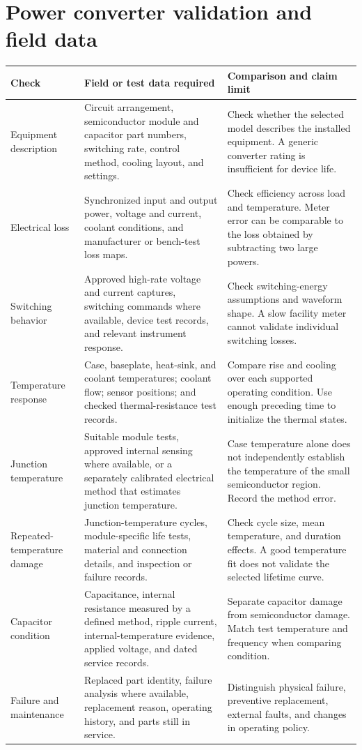 \documentclass[11pt,a4paper]{report}
\begin{document}
\section{Power converter validation and field data}
\begin{longtable}{L{0.18\textwidth}L{0.35\textwidth}L{0.35\textwidth}}
\toprule Check & Field or test data required & Comparison and claim limit \\ \midrule\endhead
Equipment description & Circuit arrangement, semiconductor module and capacitor part numbers, switching rate, control method, cooling layout, and settings. & Check whether the selected model describes the installed equipment. A generic converter rating is insufficient for device life. \\
Electrical loss & Synchronized input and output power, voltage and current, coolant conditions, and manufacturer or bench-test loss maps. & Check efficiency across load and temperature. Meter error can be comparable to the loss obtained by subtracting two large powers. \\
Switching behavior & Approved high-rate voltage and current captures, switching commands where available, device test records, and relevant instrument response. & Check switching-energy assumptions and waveform shape. A slow facility meter cannot validate individual switching losses. \\
Temperature response & Case, baseplate, heat-sink, and coolant temperatures; coolant flow; sensor positions; and checked thermal-resistance test records. & Compare rise and cooling over each supported operating condition. Use enough preceding time to initialize the thermal states. \\
Junction temperature & Suitable module tests, approved internal sensing where available, or a separately calibrated electrical method that estimates junction temperature. & Case temperature alone does not independently establish the temperature of the small semiconductor region. Record the method error. \\
Repeated-temperature damage & Junction-temperature cycles, module-specific life tests, material and connection details, and inspection or failure records. & Check cycle size, mean temperature, and duration effects. A good temperature fit does not validate the selected lifetime curve. \\
Capacitor condition & Capacitance, internal resistance measured by a defined method, ripple current, internal-temperature evidence, applied voltage, and dated service records. & Separate capacitor damage from semiconductor damage. Match test temperature and frequency when comparing condition. \\
Failure and maintenance & Replaced part identity, failure analysis where available, replacement reason, operating history, and parts still in service. & Distinguish physical failure, preventive replacement, external faults, and changes in operating policy. \\
\bottomrule
\end{longtable}
\end{document}
